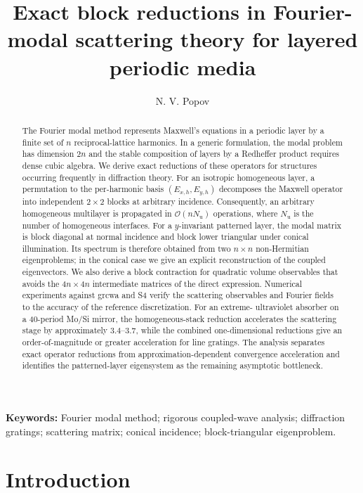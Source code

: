 \documentclass[11pt]{article}
\title{Exact block reductions in Fourier-modal scattering theory for layered periodic media}
\author[1]{N. V. Popov}
\affil[1]{Department of Physics, affiliation to be specified}
\date{}
\theoremstyle{remark}
\newcommand{\order}{\mathcal{O}}
\begin{document}
\maketitle

\begin{abstract}
The Fourier modal method represents Maxwell's equations in a periodic layer by
a finite set of $n$ reciprocal-lattice harmonics.  In a generic formulation,
the modal problem has dimension $2n$ and the stable composition of layers by a
Redheffer product requires dense cubic algebra.  We derive exact reductions of
these operators for structures occurring frequently in diffraction theory.
For an isotropic homogeneous layer, a permutation to the per-harmonic basis
$(E_{x,h},E_{y,h})$ decomposes the Maxwell operator into independent
$2\times2$ blocks at arbitrary incidence.  Consequently, an arbitrary
homogeneous multilayer is propagated in $\order(nN_{\mathrm{u}})$ operations,
where $N_{\mathrm{u}}$ is the number of homogeneous interfaces.  For a
$y$-invariant patterned layer, the modal matrix is block diagonal at normal
incidence and block lower triangular under conical illumination.  Its spectrum
is therefore obtained from two $n\times n$ non-Hermitian eigenproblems; in the
conical case we give an explicit reconstruction of the coupled eigenvectors.
We also derive a block contraction for quadratic volume observables that avoids
the $4n\times4n$ intermediate matrices of the direct expression.  Numerical
experiments against grcwa and S4 verify the scattering observables and Fourier
fields to the accuracy of the reference discretization.  For an extreme-
ultraviolet absorber on a 40-period Mo/Si mirror, the homogeneous-stack
reduction accelerates the scattering stage by approximately $3.4$--$3.7$,
while the combined one-dimensional reductions give an order-of-magnitude or
greater acceleration for line gratings.  The analysis separates exact
operator reductions from approximation-dependent convergence acceleration and
identifies the patterned-layer eigensystem as the remaining asymptotic
bottleneck.
\end{abstract}

\noindent\textbf{Keywords:} Fourier modal method; rigorous coupled-wave
analysis; diffraction gratings; scattering matrix; conical incidence;
block-triangular eigenproblem.

\section{Introduction}
\label{sec:intro}
\end{document}
